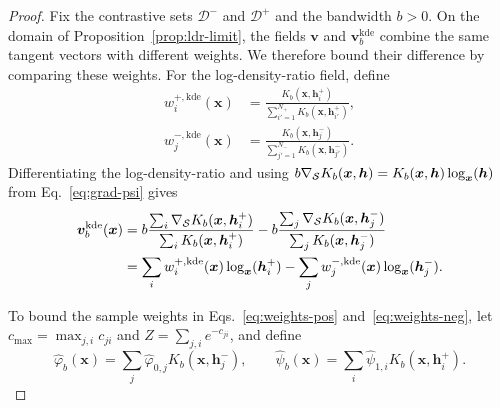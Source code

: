 \begin{proof}
Fix the contrastive sets $\mathcal{D}^-$ and $\mathcal{D}^+$ and the bandwidth $b>0$. On the domain of Proposition~\ref{prop:ldr-limit}, the fields $\boldsymbol{v}$ and $\boldsymbol{v}_b^{\mathrm{kde}}$ combine the same tangent vectors with different weights. We therefore bound their difference by comparing these weights. For the log-density-ratio field, define
\[
\begin{aligned}
w_i^{+,\mathrm{kde}}(\boldsymbol{x})
&=\frac{K_b(\boldsymbol{x},\boldsymbol{h}_i^+)}
{\sum_{i'=1}^{N_+}K_b(\boldsymbol{x},\boldsymbol{h}_{i'}^+)},\\
w_j^{-,\mathrm{kde}}(\boldsymbol{x})
&=\frac{K_b(\boldsymbol{x},\boldsymbol{h}_j^-)}
{\sum_{j'=1}^{N_-}K_b(\boldsymbol{x},\boldsymbol{h}_{j'}^-)}.
\end{aligned}
\]
Differentiating the log-density-ratio and using $b\nabla_{\mathcal{S}} K_b(\boldsymbol{x},\boldsymbol{h})=K_b(\boldsymbol{x},\boldsymbol{h})\log_{\boldsymbol{x}}(\boldsymbol{h})$ from Eq.~\eqref{eq:grad-psi} gives
\begin{equation}
\begin{aligned}
\boldsymbol{v}_b^{\mathrm{kde}}(\boldsymbol{x})
&=b\frac{\sum_i\nabla_{\mathcal{S}} K_b(\boldsymbol{x},\boldsymbol{h}_i^+)}{\sum_i K_b(\boldsymbol{x},\boldsymbol{h}_i^+)}
-b\frac{\sum_j\nabla_{\mathcal{S}} K_b(\boldsymbol{x},\boldsymbol{h}_j^-)}{\sum_j K_b(\boldsymbol{x},\boldsymbol{h}_j^-)}\\
&=\sum_i w_i^{+,\mathrm{kde}}(\boldsymbol{x})\log_{\boldsymbol{x}}(\boldsymbol{h}_i^+)
-\sum_j w_j^{-,\mathrm{kde}}(\boldsymbol{x})\log_{\boldsymbol{x}}(\boldsymbol{h}_j^-).
\end{aligned}
\label{eq:weighted-kde-field}
\end{equation}

To bound the sample weights in Eqs.~\eqref{eq:weights-pos} and~\eqref{eq:weights-neg}, let $c_{\max}=\max_{j,i}c_{ji}$ and $Z=\sum_{j,i}e^{-c_{ji}}$, and define
\begin{equation}
\widehat{\varphi}_b(\boldsymbol{x})=\sum_j\widehat{\varphi}_{0,j}K_b(\boldsymbol{x},\boldsymbol{h}_j^-),
\qquad
\widehat{\psi}_b(\boldsymbol{x})=\sum_i\widehat{\psi}_{1,i}K_b(\boldsymbol{x},\boldsymbol{h}_i^+).
\label{eq:kernel-sums-general}
\end{equation}


\end{proof}
